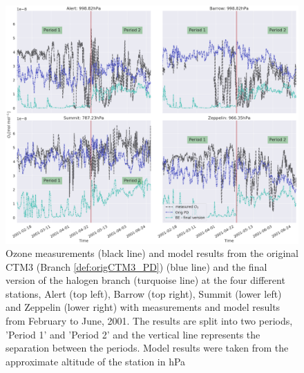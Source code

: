 \begin{figure}[h]
    \centering
    \includegraphics[width = \linewidth]{Chapter6_Results/images/ozone_stationComp_2001/ozone_2001_2periods_step5.png}
    \caption{Ozone measurements (black line) and model results from the original CTM3 (Branch \ref{def:origCTM3_PD}) (blue line) and the final version of the halogen branch (turquoise line) at the four different stations, Alert (top left), Barrow (top right), Summit (lower left) and Zeppelin (lower right) with measurements and model results from February to June, 2001. The results are split into two periods, 'Period 1' and 'Period 2' and the vertical line represents the separation between the periods. Model results were taken from the approximate altitude of the station in hPa}
    \label{fig:2p_step5}
\end{figure}